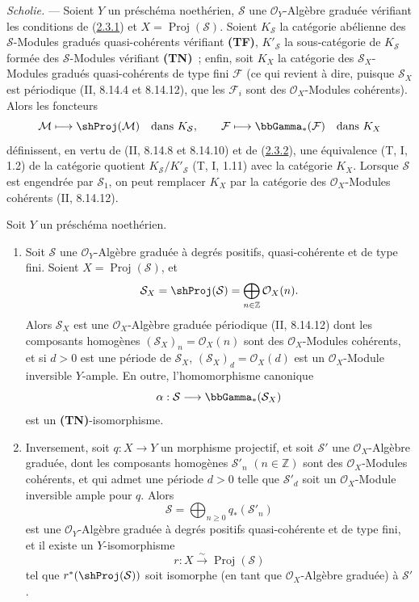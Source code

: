 \begin{env}[2.3.3]
\label{III.2.3.3-fr}
\emph{Scholie.} --- Soient $Y$ un préschéma noethérien, $\mathcal S$ une
$\mathcal O_Y$-Algèbre graduée vérifiant les conditions de
(\hyperref[III.2.3.1-fr]{2.3.1}) et $X=\operatorname{Proj}(\mathcal S)$.
Soient $K_{\mathcal S}$ la catégorie abélienne des $\mathcal S$-Modules
gradués quasi-cohérents vérifiant \textbf{(TF)}, $K'_{\mathcal S}$ la
sous-catégorie de $K_{\mathcal S}$ formée des $\mathcal S$-Modules
vérifiant \textbf{(TN)}~; enfin, soit $K_X$ la catégorie des
$\mathcal S_X$-Modules gradués quasi-cohérents de type fini $\mathcal F$
(ce qui revient à dire, puisque $\mathcal S_X$ est périodique
(II, 8.14.4 et 8.14.12), que les $\mathcal F_i$ sont des
$\mathcal O_X$-Modules cohérents). Alors les foncteurs
\[
\mathcal M\longmapsto\shProj(\mathcal M)
\quad\text{dans }K_{\mathcal S},
\qquad
\mathcal F\longmapsto\bbGamma_*(\mathcal F)
\quad\text{dans }K_X
\]
définissent, en vertu de (II, 8.14.8 et 8.14.10) et de
(\hyperref[III.2.3.2-fr]{2.3.2}), une équivalence (T, I, 1.2) de la
catégorie quotient $K_{\mathcal S}/K'_{\mathcal S}$ (T, I, 1.11) avec la
catégorie $K_X$. Lorsque $\mathcal S$ est engendrée par $\mathcal S_1$,
on peut remplacer $K_X$ par la catégorie des $\mathcal O_X$-Modules
cohérents (II, 8.14.12).
\end{env}

\begin{proposition}[2.3.4]
\label{III.2.3.4-fr}
Soit $Y$ un préschéma noethérien.
\begin{enumerate}
\item[{\rm(i)}] Soit $\mathcal S$ une $\mathcal O_Y$-Algèbre graduée à
degrés positifs, quasi-cohérente et de type fini. Soient
$X=\operatorname{Proj}(\mathcal S)$, et
\[
\mathcal S_X=\shProj(\mathcal S)
=\bigoplus_{n\in\mathbb Z}\mathcal O_X(n).
\]
Alors $\mathcal S_X$ est une $\mathcal O_X$-Algèbre graduée périodique
(II, 8.14.12) dont les composants homogènes
$(\mathcal S_X)_n=\mathcal O_X(n)$ sont des $\mathcal O_X$-Modules
cohérents, et si $d>0$ est une période de $\mathcal S_X$,
$(\mathcal S_X)_d=\mathcal O_X(d)$ est un $\mathcal O_X$-Module
inversible $Y$-ample. En outre, l'homomorphisme canonique
\[
\alpha:\mathcal S\longrightarrow\bbGamma_*(\mathcal S_X)
\]
est un \textbf{(TN)}-isomorphisme.
\item[{\rm(ii)}] Inversement, soit $q:X\to Y$ un morphisme projectif, et
soit $\mathcal S'$ une $\mathcal O_X$-Algèbre graduée, dont les composants
homogènes $\mathcal S'_n$ $(n\in\mathbb Z)$ sont des
$\mathcal O_X$-Modules cohérents, et qui admet une période $d>0$ telle que
$\mathcal S'_d$ soit un $\mathcal O_X$-Module inversible ample pour $q$.
Alors
\[
\mathcal S=\bigoplus_{n\geq0}q_*(\mathcal S'_n)
\]
est une $\mathcal O_Y$-Algèbre graduée à degrés positifs quasi-cohérente
et de type fini, et il existe un $Y$-isomorphisme
\[
r:X\xrightarrow{\sim}\operatorname{Proj}(\mathcal S)
\]
tel que $r^*(\shProj(\mathcal S))$ soit isomorphe (en tant que
$\mathcal O_X$-Algèbre graduée) à $\mathcal S'$.
\end{enumerate}
\end{proposition}

